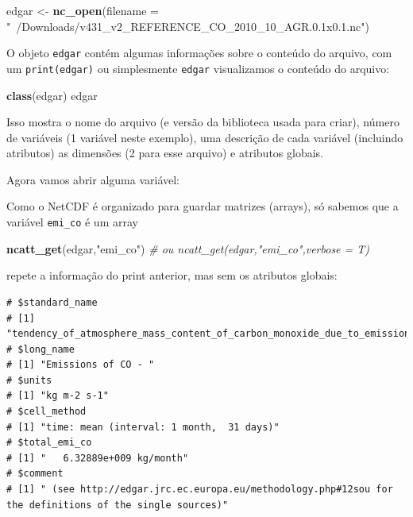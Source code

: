 \documentclass[]{book}
\newenvironment{Shaded}{\begin{snugshade}}{\end{snugshade}}
\newcommand{\KeywordTok}[1]{\textcolor[rgb]{0.13,0.29,0.53}{\textbf{#1}}}
\newcommand{\DataTypeTok}[1]{\textcolor[rgb]{0.13,0.29,0.53}{#1}}
\newcommand{\StringTok}[1]{\textcolor[rgb]{0.31,0.60,0.02}{#1}}
\newcommand{\CommentTok}[1]{\textcolor[rgb]{0.56,0.35,0.01}{\textit{#1}}}
\newcommand{\OperatorTok}[1]{\textcolor[rgb]{0.81,0.36,0.00}{\textbf{#1}}}
\newcommand{\NormalTok}[1]{#1}
\theoremstyle{definition}
\theoremstyle{definition}
\theoremstyle{definition}
\theoremstyle{remark}
\begin{document}
\begin{Shaded}
\begin{Highlighting}[]
\NormalTok{edgar <-}\StringTok{ }\KeywordTok{nc_open}\NormalTok{(}\DataTypeTok{filename =} \StringTok{"~/Downloads/v431_v2_REFERENCE_CO_2010_10_AGR.0.1x0.1.nc"}\NormalTok{)}
\end{Highlighting}
\end{Shaded}

O objeto \texttt{edgar} contém algumas informações sobre o conteúdo do
arquivo, com um \texttt{print(edgar)} ou simplesmente \texttt{edgar}
visualizamos o conteúdo do arquivo:

\begin{Shaded}
\begin{Highlighting}[]
\KeywordTok{class}\NormalTok{(edgar)}
\NormalTok{edgar}
\end{Highlighting}
\end{Shaded}

Isso mostra o nome do arquivo (e versão da biblioteca usada para criar),
número de variáveis (1 variável neste exemplo), uma descrição de cada
variável (incluindo atributos) as dimensões (2 para esse arquivo) e
atributos globais.

Agora vamos abrir alguma variável:

\begin{Shaded}
\end{Shaded}

Como o NetCDF é organizado para guardar matrizes (arrays), só sabemos
que a variável \texttt{emi\_co} é um array

\begin{Shaded}
\begin{Highlighting}[]
\KeywordTok{ncatt_get}\NormalTok{(edgar,}\StringTok{"emi_co"}\NormalTok{) }\CommentTok{# ou ncatt_get(edgar,"emi_co",verbose = T)}
\end{Highlighting}
\end{Shaded}

repete a informação do print anterior, mas sem os atributos globais:

\begin{verbatim}
# $standard_name
# [1] "tendency_of_atmosphere_mass_content_of_carbon_monoxide_due_to_emission"
# $long_name
# [1] "Emissions of CO - "
# $units
# [1] "kg m-2 s-1"
# $cell_method
# [1] "time: mean (interval: 1 month,  31 days)"
# $total_emi_co
# [1] "   6.32889e+009 kg/month"
# $comment
# [1] " (see http://edgar.jrc.ec.europa.eu/methodology.php#12sou for the definitions of the single sources)"
\end{verbatim}
\end{document}
